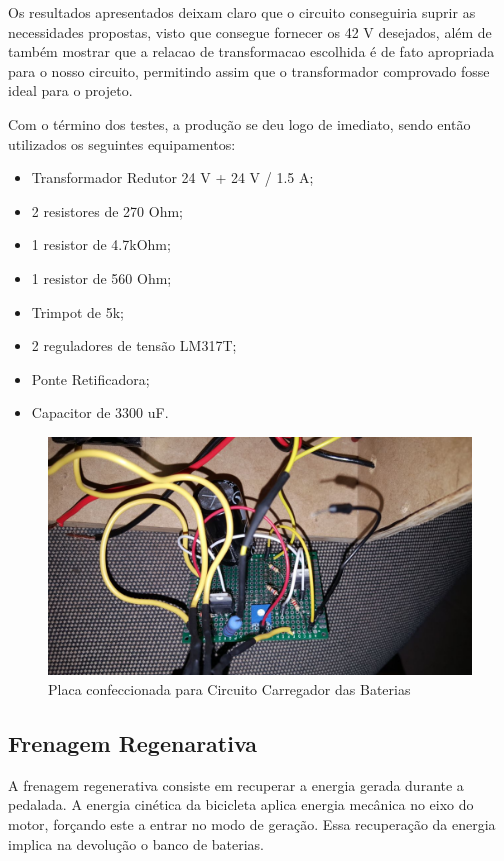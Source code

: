 Os resultados apresentados deixam claro que o circuito conseguiria suprir as necessidades propostas, visto que consegue fornecer os 42 V desejados, além de também mostrar que a relacao de transformacao escolhida é de fato apropriada para o nosso circuito, permitindo assim que o transformador comprovado fosse ideal para o projeto. 

Com o término dos testes, a produção se deu logo de imediato, sendo então utilizados os seguintes equipamentos:

\begin{itemize}
\item Transformador Redutor 24 V + 24 V / 1.5 A;
\item 2 resistores de 270 Ohm;
\item 1 resistor de 4.7kOhm;
\item 1 resistor de 560 Ohm;
\item Trimpot de 5k; 
\item 2 reguladores de tensão LM317T;
\item Ponte Retificadora;
\item Capacitor de 3300 uF.
\end{itemize}

\graphicspath{{figuras/}}
\begin{figure}[h]
\centering
\includegraphics[scale=0.30]{placa_confeccionada}
\caption{Placa confeccionada para Circuito Carregador das Baterias}
\label{placa}
\end{figure}

\subsection{Frenagem Regenarativa}
A frenagem regenerativa consiste em recuperar a energia gerada durante a pedalada. A energia cinética da bicicleta aplica energia mecânica no eixo do motor, forçando este a entrar no modo de geração. Essa recuperação da energia implica na devolução o banco de baterias. 


